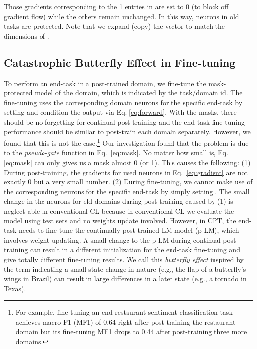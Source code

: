\documentclass[11pt]{article}
\begin{document}
Those gradients corresponding to the 1 entries in  are set to 0 (to block off gradient flow) while the others remain unchanged. 
In this way, neurons in old tasks are protected. Note that we expand (copy) the vector  to match the dimensions of .

















\subsection{Catastrophic Butterfly Effect in Fine-tuning}
\label{sec:butterfly}


To perform an end-task in a post-trained domain, we fine-tune the mask-protected model of the domain, which is indicated by the task/domain id. The fine-tuning uses the corresponding domain neurons for the specific end-task {by setting  and condition the output via Eq. \ref{eq:forward}}. With the masks, there should be no forgetting for continual post-training and the end-task fine-tuning performance should be similar to post-train each domain separately. However, we found that this is not the case.\footnote{For example, fine-tuning an end restaurant sentiment classification task achieves macro-F1 (MF1) of 0.64 right after post-training the restaurant domain but its fine-tuning MF1 drops to 0.44 after post-training three more domains.} Our investigation found that the problem is due to the \textit{pseudo-gate} function in Eq.~\ref{eq:mask}. No matter how small  is, Eq. \ref{eq:mask} can only gives us a mask almost 0 (or 1). This causes the following: (1) During post-training, 
{the gradients for used neurons in Eq.~\ref{eq:gradient} are not exactly 0 but a very small number.} (2) During fine-tuning, we cannot make use of the corresponding neurons for the specific end-task by simply setting . The small change in the neurons for old domains during post-training caused by (1) is neglect-able in conventional CL because in conventional CL we evaluate the model using test sets and no weights update involved. However, in CPT, the end-task needs to fine-tune the continually post-trained LM model (p-LM), which involves weight updating. A small change to the p-LM during continual post-training can result in a different initialization for the end-task fine-tuning and give totally different fine-tuning results. We call this \textit{butterfly effect} inspired by the term indicating a small state change in  nature (e.g., the flap of a butterfly’s wings in Brazil) can result in large differences in a later state (e.g., a tornado in Texas). 
\end{document}
